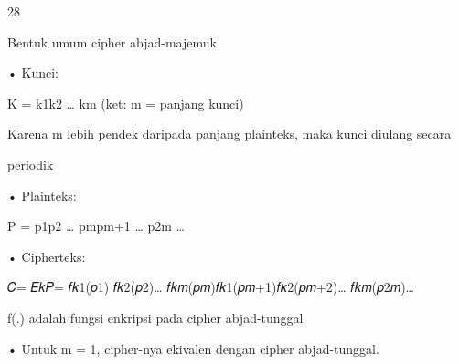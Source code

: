 \documentclass{article}
\begin{document}

28

Bentuk umum cipher abjad-majemuk

• Kunci:        

              K = k1k2 … km                       (ket: m = panjang kunci)

   Karena m lebih pendek daripada panjang plainteks, maka kunci diulang secara 

periodik

• Plainteks:  

              P = p1p2 … pmpm+1 … p2m …                       

• Cipherteks:

          𝐶= 𝐸𝑘𝑃= 𝑓𝑘1(𝑝1) 𝑓𝑘2(𝑝2)… 𝑓𝑘𝑚(𝑝𝑚)𝑓𝑘1(𝑝𝑚+1)𝑓𝑘2(𝑝𝑚+2)… 𝑓𝑘𝑚(𝑝2𝑚)…


f(.) adalah fungsi enkripsi pada cipher abjad-tunggal  


• Untuk m = 1, cipher-nya ekivalen dengan cipher abjad-tunggal.
\end{document}
